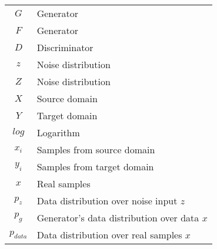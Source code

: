 

\begin{tabular}{cp{}}
  $G$ & Generator \\
  $F$ &  Generator \\
  $D$ & Discriminator \\
  $z$  & Noise distribution\\
  $Z$  & Noise distribution\\
  $X$  & Source domain\\
  $Y$  & Target domain\\
  $log$ & Logarithm \\
  $x_i$  & Samples from source domain\\
  $y_i$  & Samples from target domain\\
  
  
  $x$ & Real samples\\
  $p_z$ & Data distribution over noise input $z$\\
  $p_g$ & Generator’s data distribution over data $x$\\
  $p_{data}$ & Data distribution over real samples $x$\\


  
\end{tabular}\\